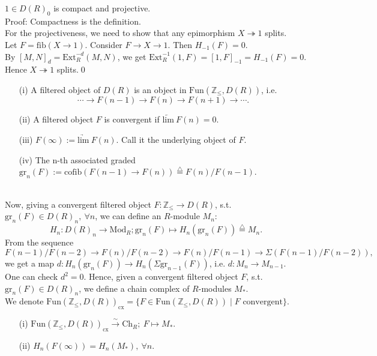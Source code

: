\documentclass[UTF8,12,a4paper]{ctexart}
\theoremstyle{definition}
\begin{document}
\rem 
$1\in D(R)_0$ is compact and projective.\\
Proof:
Compactness is the definition.\\
For the projectiveness, we need to show that any epimorphism $X\twoheadrightarrow 1$ splits.\\
Let $F=\text{fib}(X\to 1)$. Consider $F\to X\to 1$.  Then $H_{-1}(F)=0.$\\
By $[M,N]_d=\text{Ext}_R^{-d}(M,N)$, we get $\text{Ext}_R^{-1}(1,F)=[1,F]_{-1}=H_{-1}(F)=0$. Hence $X\twoheadrightarrow 1$ splits.\qed
\newline
\newline
\newline
\dfn 
\begin{itemize}
	\item [(i)]A filtered object of $D(R)$ is an object in $\text{Fun}(\mathbb{Z}_{\leq }, D(R))$, i.e.
	$$\cdots\longrightarrow F(n-1)\rightarrow F(n)\rightarrow F(n+1)\rightarrow\cdots.$$
	\item [(ii)] A filtered object $F$ is convergent if $\underleftarrow{\text{lim}}\ F(n)=0.$
	\item [(iii)] $F(\infty):=\underrightarrow{\text{lim}}\ F(n).$ Call it the underlying object of $F$.
	\item [(iv)] The n-th associated graded $\text{gr}_n (F):=\text{cofib}(F(n-1)\to F(n))\stackrel{\triangle}{=}F(n)/F(n-1).$
\end{itemize}

~\\
Now, giving a convergent filtered object $F:\mathbb{Z}_{\leq }\rightarrow D(R)$, s.t. $\text{gr}_n (F)\in D(R)_n,\ \forall n$, we can define an $R$-module $M_n$:
$$
H_n: D(R)_n\rightarrow \text{Mod}_R; \text{gr}_n (F)\mapsto H_n(\text{gr}_n (F))\stackrel{\triangle}{=}M_n.
$$
From the sequence
$$
F(n-1)/F(n-2)\longrightarrow F(n)/F(n-2)\longrightarrow F(n)/F(n-1)\longrightarrow \Sigma(F(n-1)/F(n-2)),
$$
we get a map $d:H_n(\text{gr}_n (F))\longrightarrow H_n(\Sigma \text{gr}_{n-1} (F))$, i.e. $d:M_n\longrightarrow M_{n-1}$.\\
One can check $d^2=0$. Hence, given a convergent filtered object $F$, s.t. $\text{gr}_n (F)\in D(R)_n$, we define a chain complex of $R$-modules $M_*$.\\
We denote $\text{Fun}(\mathbb{Z}_{\leq }, D(R))_{\text{cx}}=\{F\in \text{Fun}(\mathbb{Z}_{\leq }, D(R))\mid F \text{ convergent} \}.$
\prop 
\begin{itemize}
	\item [(i)]$\text{Fun}(\mathbb{Z}_{\leq }, D(R))_{\text{cx}}\stackrel{\sim}{\longrightarrow} \text{Ch}_R;\ F\mapsto M_*.$
	\item [(ii)] $H_n(F(\infty))=H_n(M_*),\ \forall n.$
\end{itemize}
\end{document}
